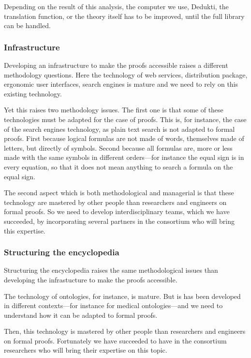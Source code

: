 Depending on the result of this analysis, the computer we use, Dedukti,
the translation function, or the theory itself has to be improved, until
the full library can be handled.

\subsubsection*{Infrastructure}

Developing an infrastructure to make the proofs accessible raises a
different methodology questions. Here the technology of web services,
distribution package, ergonomic user interfaces, search engines is
mature and we need to rely on this existing technology.

Yet this raises two methodology issues. The first one is that some of
these technologies must be adapted for the case of proofs. This is,
for instance, the case of the search engines technology, as plain text
search is not adapted to formal proofs. First because logical formulas
are not made of words, themselves made of letters, but directly of
symbols. Second because all formulas are, more or less made with the
same symbols in different orders---for instance the equal sign is in
every equation, so that it does not mean anything to search a formula
on the equal sign.

The second aspect which is both methodological and managerial is that
these technology are mastered by other people than researchers and
engineers on formal proofs. So we need to develop interdisciplinary
teams, which we have succeeded, by incorporating several partners
in the consortium who will bring this expertise.

\subsubsection*{Structuring the encyclopedia}

Structuring the encyclopedia raises the same methodological issues
than developing the infrastucture to make the proofs accessible.

The technology of ontologies, for instance, is mature. But is has been
developed in different contexts---for instance for medical
ontologies---and we need to understand how it can be adapted to formal
proofs. 

Then, this technology is mastered by other people than researchers and
engineers on formal proofs. Fortunately we have succeeded to have in
the consortium researchers who will bring their expertise on this
topic.


